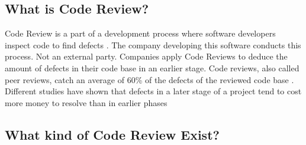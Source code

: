 \subsection*{What is Code Review?}

Code Review is a part of a development process where software developers inspect code to find defects \autocite[47]{10.1109/MS.2003.1241366}.
The company developing this software conducts this process.
Not an external party.
Companies apply Code Reviews to deduce the amount of defects in their code base in an earlier stage.
Code reviews, also called peer reviews, catch an average of 60\% of the defects of the reviewed code base \autocite[136]{10.1109/2.962984}.
Different studies have shown that defects in a later stage of a project tend to cost more money to resolve than in earlier phases \autocite[135]{10.1109/2.962984} \autocite[21]{beck2000extreme}

\subsection*{What kind of Code Review Exist?}

